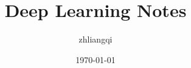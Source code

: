 \documentclass{book}
\begin{document}
\title{Deep Learning Notes}
\author{zhliangqi}
\date{\today}

\maketitle

\tableofcontents



% 
% 

% 
% 
% 
% 
% 
% 
% 
% 
% 
% 
% 




\end{document}
